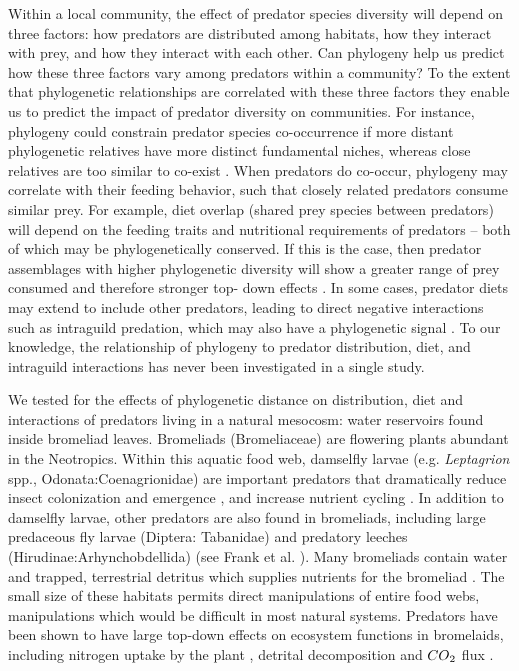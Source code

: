 Within a local community, the effect of predator species diversity will
depend on three factors: how predators are distributed among habitats,
how they interact with prey, and how they interact with each other. Can
phylogeny help us predict how these three factors vary among predators
within a community? To the extent that phylogenetic relationships are
correlated with these three factors they enable us to predict the impact
of predator diversity on communities. For instance, phylogeny could
constrain predator species co-occurrence if more distant phylogenetic
relatives have more distinct fundamental niches, whereas close relatives
are too similar to co-exist \citep{Webb2002, Emerson2008}. When
predators do co-occur, phylogeny may correlate with their feeding
behavior, such that closely related predators consume similar prey. For
example, diet overlap (shared prey species between predators) will
depend on the feeding traits and nutritional requirements of predators
-- both of which may be phylogenetically conserved. If this is the case,
then predator assemblages with higher phylogenetic diversity will show a
greater range of prey consumed and therefore stronger top- down effects
\citep{Finke2008a}. In some cases, predator diets may extend to include
other predators, leading to direct negative interactions such as
intraguild predation, which may also have a phylogenetic signal
\citep{Pfennig2000}. To our knowledge, the relationship of phylogeny to
predator distribution, diet, and intraguild interactions has never been
investigated in a single study.

We tested for the effects of phylogenetic distance on distribution, diet
and interactions of predators living in a natural mesocosm: water
reservoirs found inside bromeliad leaves. Bromeliads (Bromeliaceae) are
flowering plants abundant in the Neotropics. Within this aquatic food
web, damselfly larvae (e.g. \emph{Leptagrion} spp.,
Odonata:Coenagrionidae) are important predators that dramatically reduce
insect colonization \citep{Hammill2015} and emergence
\citep{Starzomski2010}, and increase nutrient cycling \citep{Ngai2006}.
In addition to damselfly larvae, other predators are also found in
bromeliads, including large predaceous fly larvae (Diptera: Tabanidae)
and predatory leeches (Hirudinae:Arhynchobdellida) (see Frank et al.
\citeyearpar{Frank2009}). Many bromeliads contain water and trapped,
terrestrial detritus which supplies nutrients for the bromeliad
\citep{Reich2003a}. The small size of these habitats permits direct
manipulations of entire food webs, manipulations which would be
difficult in most natural systems. Predators have been shown to have
large top-down effects on ecosystem functions in bromelaids, including
nitrogen uptake by the plant \citep{Ngai2006}, detrital decomposition
and $CO\textsubscript{2}$ flux \citep{Atwood2014, Atwood2013}.

